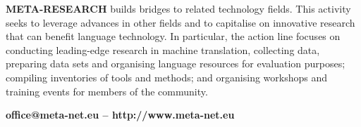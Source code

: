 \begin{multicols}{2}
\textbf{META-RESEARCH} builds bridges to related technology fields. This activity seeks to leverage advances in other fields and to capitalise on innovative research that can benefit language technology. In particular, the action line focuses on conducting leading-edge research in machine translation, collecting data, preparing data sets and organising language resources for evaluation purposes; compiling inventories of tools and methods; and organising workshops and training events for members of the community.\\
\centerline{\textbf{office@meta-net.eu -- http://www.meta-net.eu}}
\end{multicols}

\vfill
\cleardoublepage

\appendix
{}



  
\cleardoublepage

\label{metanetmembers}

\small

